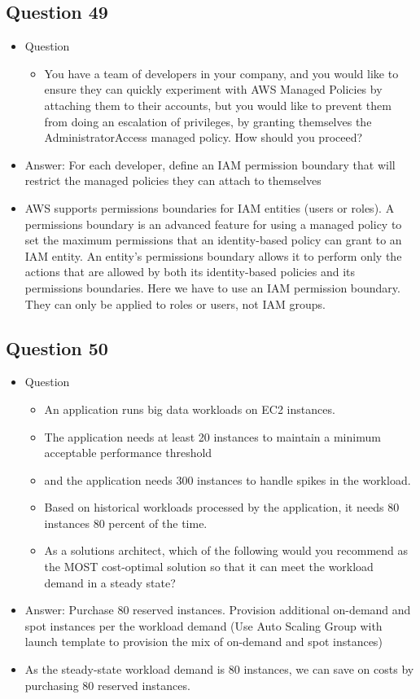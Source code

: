\documentclass[]{scrartcl}
\begin{document}
\subsection{Question 49}
\begin{itemize}
	\item Question
	\begin{itemize}
		\item You have a team of developers in your company, and you would like to ensure they can quickly experiment with AWS Managed Policies by attaching them to their accounts, but you would like to prevent them from doing an escalation of privileges, by granting themselves the AdministratorAccess managed policy. How should you proceed?
	\end{itemize}
	\item Answer: For each developer, define an IAM permission boundary that will restrict the managed policies they can attach to themselves
	\item AWS supports permissions boundaries for IAM entities (users or roles). A permissions boundary is an advanced feature for using a managed policy to set the maximum permissions that an identity-based policy can grant to an IAM entity. An entity's permissions boundary allows it to perform only the actions that are allowed by both its identity-based policies and its permissions boundaries. Here we have to use an IAM permission boundary. They can only be applied to roles or users, not IAM groups.
\end{itemize}

\subsection{Question 50}
\begin{itemize}
	\item Question
	\begin{itemize}
		\item An application runs big data workloads on EC2 instances. 
		\item The application needs at least 20 instances to maintain a minimum acceptable performance threshold \item and the application needs 300 instances to handle spikes in the workload. 
		\item Based on historical workloads processed by the application, it needs 80 instances 80 percent of the time.
		\item As a solutions architect, which of the following would you recommend as the MOST cost-optimal solution so that it can meet the workload demand in a steady state?
	\end{itemize}
	\item Answer: Purchase 80 reserved instances. Provision additional on-demand and spot instances per the workload demand (Use Auto Scaling Group with launch template to provision the mix of on-demand and spot instances)
	\item As the steady-state workload demand is 80 instances, we can save on costs by purchasing 80 reserved instances.
\end{itemize}
\end{document}
